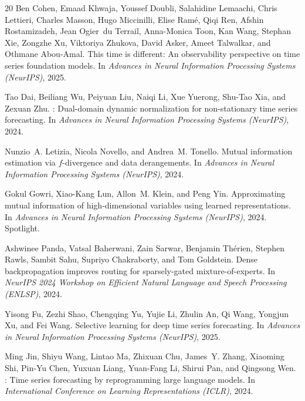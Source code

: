 \documentclass{article}
\begin{document}
\begin{thebibliography}{20}
Ben Cohen, Emaad Khwaja, Youssef Doubli, Salahidine Lemaachi, Chris Lettieri, Charles Masson, Hugo Miccinilli, Elise Ram\'{e}, Qiqi Ren, Afshin Rostamizadeh, Jean Ogier~du Terrail, Anna-Monica Toon, Kan Wang, Stephan Xie, Zongzhe Xu, Viktoriya Zhukova, David Asker, Ameet Talwalkar, and Othmane Abou-Amal.
\newblock This time is different: An observability perspective on time series foundation models.
\newblock In \textit{Advances in Neural Information Processing Systems (NeurIPS)}, 2025.

Tao Dai, Beiliang Wu, Peiyuan Liu, Naiqi Li, Xue Yuerong, Shu-Tao Xia, and Zexuan Zhu.
: Dual-domain dynamic normalization for non-stationary time series forecasting.
\newblock In \textit{Advances in Neural Information Processing Systems (NeurIPS)}, 2024.

Nunzio~A. Letizia, Nicola Novello, and Andrea~M. Tonello.
\newblock Mutual information estimation via $f$-divergence and data derangements.
\newblock In \textit{Advances in Neural Information Processing Systems (NeurIPS)}, 2024.

Gokul Gowri, Xiao-Kang Lun, Allon~M. Klein, and Peng Yin.
\newblock Approximating mutual information of high-dimensional variables using learned representations.
\newblock In \textit{Advances in Neural Information Processing Systems (NeurIPS)}, 2024.
\newblock Spotlight.

Ashwinee Panda, Vatsal Baherwani, Zain Sarwar, Benjamin Th\'{e}rien, Stephen Rawls, Sambit Sahu, Supriyo Chakraborty, and Tom Goldstein.
\newblock Dense backpropagation improves routing for sparsely-gated mixture-of-experts.
\newblock In \textit{NeurIPS 2024 Workshop on Efficient Natural Language and Speech Processing (ENLSP)}, 2024.

Yisong Fu, Zezhi Shao, Chengqing Yu, Yujie Li, Zhulin An, Qi Wang, Yongjun Xu, and Fei Wang.
\newblock Selective learning for deep time series forecasting.
\newblock In \textit{Advances in Neural Information Processing Systems (NeurIPS)}, 2025.

Ming Jin, Shiyu Wang, Lintao Ma, Zhixuan Chu, James~Y. Zhang, Xiaoming Shi, Pin-Yu Chen, Yuxuan Liang, Yuan-Fang Li, Shirui Pan, and Qingsong Wen.
: Time series forecasting by reprogramming large language models.
\newblock In \textit{International Conference on Learning Representations (ICLR)}, 2024.


\end{thebibliography}
\end{document}

